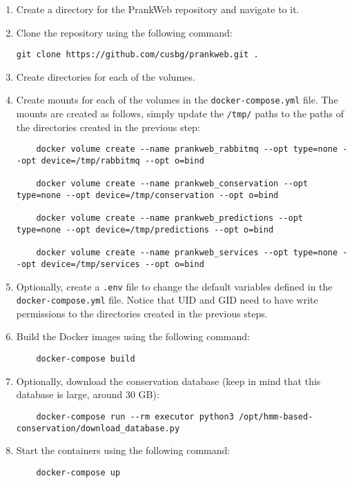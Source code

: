 \begin{enumerate}
    \item Create a directory for the PrankWeb repository and navigate to it.
    \item Clone the repository using the following command:
    \begin{lstlisting}[language=clean]
    git clone https://github.com/cusbg/prankweb.git .
    \end{lstlisting}
    \item Create directories for each of the volumes.
    \item Create mounts for each of the volumes in the \texttt{docker-compose.yml} file. The mounts are created as follows, simply update the \texttt{/tmp/} paths to the paths of the directories created in the previous step:
    \begin{lstlisting}
    docker volume create --name prankweb_rabbitmq --opt type=none --opt device=/tmp/rabbitmq --opt o=bind

    docker volume create --name prankweb_conservation --opt type=none --opt device=/tmp/conservation --opt o=bind

    docker volume create --name prankweb_predictions --opt type=none --opt device=/tmp/predictions --opt o=bind

    docker volume create --name prankweb_services --opt type=none --opt device=/tmp/services --opt o=bind
    \end{lstlisting}
    \item Optionally, create a \texttt{.env} file to change the default variables defined in the \texttt{docker-compose.yml} file. Notice that UID and GID need to have write permissions to the directories created in the previous steps.
    \item Build the Docker images using the following command:
    \begin{lstlisting}
    docker-compose build
    \end{lstlisting}
    \item Optionally, download the conservation database (keep in mind that this database is large, around 30 GB):
    \begin{lstlisting}
    docker-compose run --rm executor python3 /opt/hmm-based-conservation/download_database.py
    \end{lstlisting}
    \item Start the containers using the following command:
    \begin{lstlisting}
    docker-compose up
    \end{lstlisting}
\end{enumerate}

